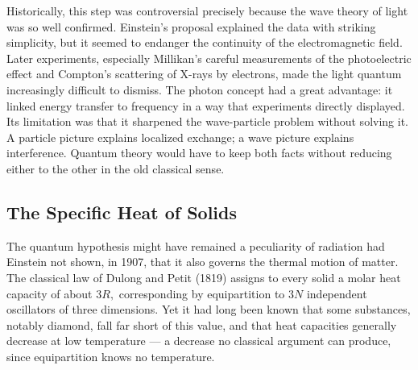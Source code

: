 Historically, this step was controversial precisely because the wave theory of light was so well confirmed. Einstein's proposal explained the data with striking simplicity, but it seemed to endanger the continuity of the electromagnetic field. Later experiments, especially Millikan's careful measurements of the photoelectric effect and Compton's scattering of X-rays by electrons, made the light quantum increasingly difficult to dismiss. The photon concept had a great advantage: it linked energy transfer to frequency in a way that experiments directly displayed. Its limitation was that it sharpened the wave-particle problem without solving it. A particle picture explains localized exchange; a wave picture explains interference. Quantum theory would have to keep both facts without reducing either to the other in the old classical sense.

\subsection{The Specific Heat of Solids}
The quantum hypothesis might have remained a peculiarity of radiation had Einstein not shown, in 1907, that it also governs the thermal motion of matter. The classical law of Dulong and Petit (1819) assigns to every solid a molar heat capacity of about $3R,$ corresponding by equipartition to $3N$ independent oscillators of three dimensions. Yet it had long been known that some substances, notably diamond, fall far short of this value, and that heat capacities generally decrease at low temperature --- a decrease no classical argument can produce, since equipartition knows no temperature.

